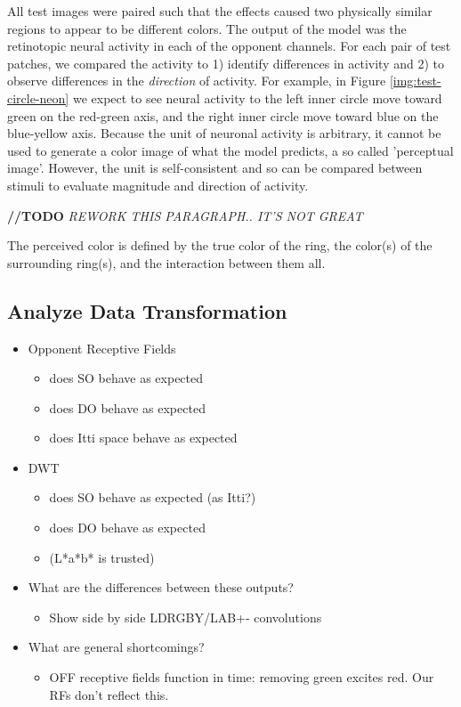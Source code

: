 \documentclass[journal,onecolumn]{IEEEtran}
\begin{document}
 All test images were paired such that the effects caused two physically similar regions to appear to be different colors. The output of the model was the retinotopic neural activity in each of the opponent channels. For each pair of test patches, we compared the activity to 1) identify differences in activity and 2) to observe differences in the \textit{direction} of activity. For example, in Figure \ref{img:test-circle-neon} we expect to see neural activity to the left inner circle move toward green on the red-green axis, and the right inner circle move toward blue on the blue-yellow axis. Because the unit of neuronal activity is arbitrary, it cannot be used to generate a color image of what the model predicts, a so called 'perceptual image'. However, the unit is self-consistent and so can be compared between stimuli to evaluate magnitude and direction of activity.

\textbf{//TODO} \textit{REWORK THIS PARAGRAPH.. IT'S NOT GREAT}

The perceived color is defined by the true color of the ring, the color(s) of the surrounding ring(s), and the interaction between them all.



\subsection*{Analyze Data Transformation}
\begin{itemize}
    \item Opponent Receptive Fields
    \begin{itemize}
        \item does SO behave as expected
        \item does DO behave as expected
        \item does Itti space behave as expected
    \end{itemize}
    \item DWT
    \begin{itemize}
        \item does SO behave as expected (as Itti?)
        \item does DO behave as expected
        \item (L*a*b* is trusted)
    \end{itemize}
    \item What are the differences between these outputs?
    \begin{itemize}
        \item Show side by side LDRGBY/LAB+- convolutions
    \end{itemize}
    \item What are general shortcomings?
    \begin{itemize}
        \item OFF receptive fields function in time: removing green excites red. Our RFs don't reflect this.
    \end{itemize}
\end{itemize}
\end{document}

